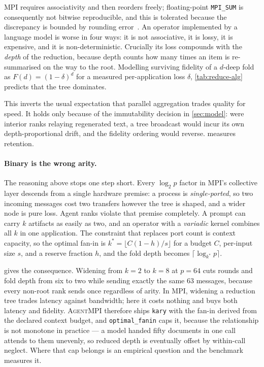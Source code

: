 \documentclass[10pt,twocolumn]{article}
\theoremstyle{definition}
\theoremstyle{plain}
\newcommand{\ampi}{\textsc{AgentMPI}}
\newcommand{\code}[1]{\texttt{\small #1}}
\begin{document}
MPI requires associativity and then reorders freely; floating-point \code{MPI\_SUM}
is consequently not bitwise reproducible, and this is tolerated because the
discrepancy is bounded by rounding error~\cite{Demmel15}. An operator implemented
by a language model is worse in four ways: it is not associative, it is lossy, it is
expensive, and it is non-deterministic. Crucially its loss compounds with the
\emph{depth} of the reduction, because depth counts how many times an item is
re-summarised on the way to the root. Modelling surviving fidelity of a $d$-deep
fold as $F(d)=(1-\delta)^d$ for a measured per-application loss $\delta$,
\cref{tab:reduce-alg} predicts that the tree dominates.

This inverts the usual expectation that parallel aggregation trades quality for
speed. It holds only because of the immutability decision in
\cref{sec:model}: were interior ranks relaying regenerated text, a tree broadcast
would incur its own depth-proportional drift, and the fidelity ordering would
reverse.  measures retention.

\paragraph{Binary is the wrong arity.} The reasoning above stops one step short.
Every $\log_2 p$ factor in MPI's collective layer descends from a single hardware
premise: a process is \emph{single-ported}, so two incoming messages cost two
transfers however the tree is shaped, and a wider node is pure loss. Agent ranks
violate that premise completely. A prompt can carry $k$ artifacts as easily as two,
and an operator with a \emph{variadic} kernel combines all $k$ in one application.
The constraint that replaces port count is context capacity, so the optimal fan-in
is $k^{*}=\lfloor C(1-h)/s \rfloor$ for a budget $C$, per-input size $s$, and a
reserve fraction $h$, and the fold depth becomes $\lceil\log_{k^{*}} p\rceil$.

 gives the consequence. Widening from $k{=}2$ to $k{=}8$ at $p=64$
cuts rounds and fold depth from six to two while sending exactly the same 63
messages, because every non-root rank sends once regardless of arity. In MPI,
widening a reduction tree trades latency against bandwidth; here it costs nothing
and buys both latency and fidelity. \ampi{} therefore ships \code{kary} with the
fan-in derived from the declared context budget, and \code{optimal\_fanin} caps it,
because the relationship is not monotone in practice --- a model handed fifty
documents in one call attends to them unevenly, so reduced depth is eventually
offset by within-call neglect. Where that cap belongs is an empirical question and
the benchmark measures it.
\end{document}
